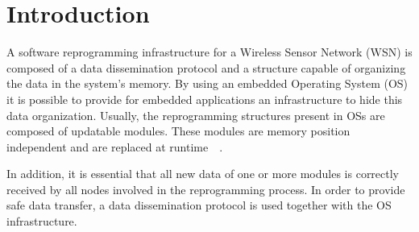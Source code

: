 \section{Introduction}


A software reprogramming infrastructure for a Wireless Sensor Network (WSN) is composed of a data dissemination protocol and a structure capable of organizing the data in the system's memory. By using an embedded Operating System (OS) it is possible to provide for embedded applications an infrastructure to hide this data organization. Usually, the reprogramming structures present in OSs are composed of updatable modules. These modules are memory position independent and are replaced at runtime~\cite{sos}~\cite{contiki}. 

In addition, it is essential that all new data of one or more modules is correctly received by all nodes involved in the reprogramming process. In order to provide safe data transfer, a data dissemination protocol is used together with the OS infrastructure.

